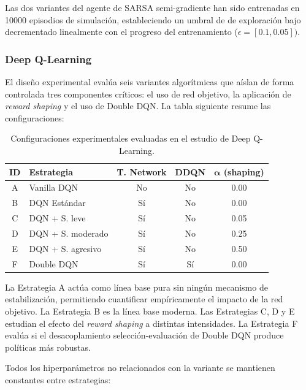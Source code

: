Las dos variantes del agente de SARSA semi-gradiente han sido entrenadas en 10000 episodios de simulación, estableciendo un umbral de de exploración bajo decrementado linealmente con el progreso del entrenamiento ($\epsilon = [0.1, 0.05])$.

\subsubsection{Deep Q-Learning}

El diseño experimental evalúa seis variantes algorítmicas que aíslan de forma controlada tres componentes críticos: el uso de red objetivo, la aplicación de \textit{reward shaping} y el uso de Double DQN. La tabla siguiente resume las configuraciones:

\begin{table}[htbp]
\centering
\begin{scriptsize}
\begin{tabular}{c l c c c}
\hline
\textbf{ID} & \textbf{Estrategia} & \textbf{T. Network} & \textbf{DDQN} & $\boldsymbol{\alpha}$ \textbf{(shaping)} \\
\hline
A & Vanilla DQN          & No & No & 0.00 \\
B & DQN Estándar         & Sí & No & 0.00 \\
C & DQN + S. leve   & Sí & No & 0.05 \\
D & DQN + S. moderado & Sí & No & 0.25 \\
E & DQN + S. agresivo & Sí & No & 0.50 \\
F & Double DQN           & Sí & Sí & 0.00 \\
\hline
\end{tabular}
\end{scriptsize}
\caption{Configuraciones experimentales evaluadas en el estudio de Deep Q-Learning.}
\label{tab:dqn_configs}
\end{table}

La Estrategia A actúa como línea base pura sin ningún mecanismo de estabilización, permitiendo cuantificar empíricamente el impacto de la red objetivo. La Estrategia B es la línea base moderna. Las Estrategias C, D y E estudian el efecto del \textit{reward shaping} a distintas intensidades. La Estrategia F evalúa si el desacoplamiento selección-evaluación de Double DQN produce políticas más robustas.

Todos los hiperparámetros no relacionados con la variante se mantienen constantes entre estrategias:

